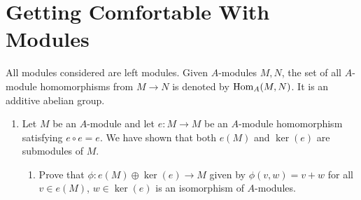 \documentclass[../psets.tex]{subfiles}
\begin{document}
\section{Getting Comfortable With Modules}
All modules considered are left modules. Given $A$-modules $M,N$, the set of all $A$-module homomorphisms from $M\to N$ is denoted by $\operatorname{Hom}_A(M,N)$. It is an additive abelian group.
\begin{enumerate}
    \item {}Let $M$ be an $A$-module and let $e:M\to M$ be an $A$-module homomorphism satisfying $e\circ e=e$. We have shown that both $e(M)$ and $\ker(e)$ are submodules of $M$. %
    \begin{enumerate}
        \item Prove that $\phi:e(M)\oplus\ker(e)\to M$ given by $\phi(v,w)=v+w$ for all $v\in e(M)$, $w\in\ker(e)$ is an isomorphism of $A$-modules.

\end{enumerate}
\end{enumerate}
\end{document}
